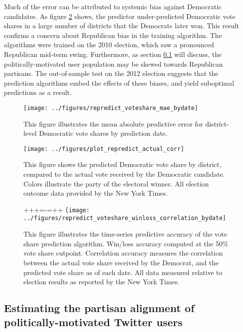 \documentclass[11pt]{article}
\begin{document}
Much of the error can be attributed to systemic bias against
Democratic candidates. As figure
\ref{fig:predicted-actual-voteshare-bydistrict} shows, the
predictor under-predicted Democratic vote shares in a large number of
districts that the Democrats later won. This result confirms a concern
about Republican bias in the training algorithm. The algorithms were
trained on the 2010 election, which saw a pronounced Republican
mid-term swing. Furthermore, as section \ref{sec:estim-user-part} will
discuss, the politically-motivated user population may be skewed
towards Republican partisans. The out-of-sample test on the 2012
election suggests that the prediction algorithms embed the effects of
these biases, and yield suboptimal predictions as a result.


\begin{figure}[ht]
  \centering
  \texttt{[image: ../figures/repredict\_voteshare\_mae\_bydate]}
  \caption{This figure illustrates the mean absolute predictive error for district-level Democratic vote shares by prediction date.}
  \label{fig:voteshare-mae}
\end{figure}

\begin{figure}[ht]
  \centering
  \texttt{[image: ../figures/plot\_repredict\_actual\_corr]}
  \caption{This figure shows the predicted Democratic vote share by district, compared to the actual vote received by the Democratic candidate. Colors illustrate the party of the electoral winner. All election outcome data provided by the New York Times.}
  \label{fig:predicted-actual-voteshare-bydistrict}
\end{figure}

\begin{figure}[ht]
  \centering
+++=-=++  \texttt{[image: ../figures/repredict\_voteshare\_winloss\_correlation\_bydate]}
  \caption{This figure illustrates the time-series predictive accuracy of the vote share prediction algorithm. Win/loss accuracy computed at the 50\% vote share cutpoint. Correlation accuracy measures the correlation between the actual vote share received by the Democrat, and the predicted vote share as of each date. All data measured relative to election results as reported by the New York Times.}
  \label{fig:pred-acc-corr-timeseries}
\end{figure}


\subsection{Estimating the partisan alignment of politically-motivated
Twitter users}
\label{sec:estim-user-part}
\end{document}
